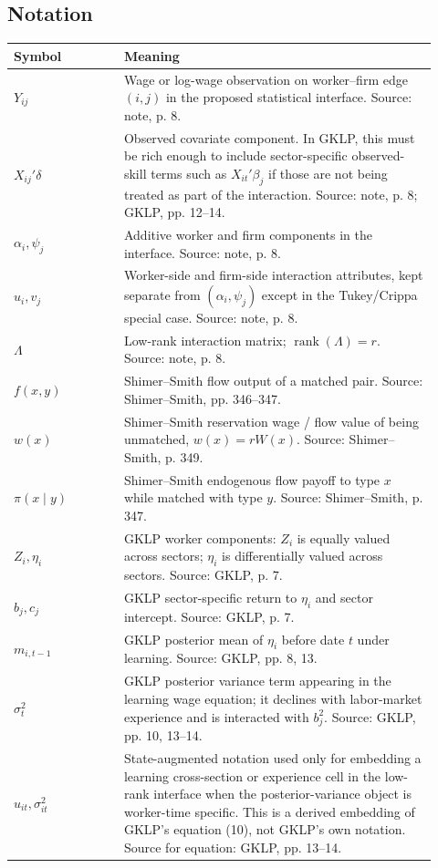 \documentclass[11pt]{article}
\begin{document}
\subsection{Notation}

\begin{center}
\begin{tabular}{>{\raggedright\arraybackslash}p{0.24\linewidth}
                >{\raggedright\arraybackslash}p{0.68\linewidth}}
\toprule
Symbol & Meaning \\
\midrule
$Y_{ij}$ & Wage or log-wage observation on worker--firm edge $(i,j)$ in the proposed statistical interface. Source: note, p. 8. \\
$X_{ij}'\delta$ & Observed covariate component. In GKLP, this must be rich enough to include sector-specific observed-skill terms such as $X_{it}'\beta_j$ if those are not being treated as part of the interaction. Source: note, p. 8; GKLP, pp. 12--14. \\
$\alpha_i,\psi_j$ & Additive worker and firm components in the interface. Source: note, p. 8. \\
$u_i,v_j$ & Worker-side and firm-side interaction attributes, kept separate from $(\alpha_i,\psi_j)$ except in the Tukey/Crippa special case. Source: note, p. 8. \\
$\Lambda$ & Low-rank interaction matrix; $\operatorname{rank}(\Lambda)=r$. Source: note, p. 8. \\
$f(x,y)$ & Shimer--Smith flow output of a matched pair. Source: Shimer--Smith, pp. 346--347. \\
$w(x)$ & Shimer--Smith reservation wage / flow value of being unmatched, $w(x)=rW(x)$. Source: Shimer--Smith, p. 349. \\
$\pi(x\mid y)$ & Shimer--Smith endogenous flow payoff to type $x$ while matched with type $y$. Source: Shimer--Smith, p. 347. \\
$Z_i,\eta_i$ & GKLP worker components: $Z_i$ is equally valued across sectors; $\eta_i$ is differentially valued across sectors. Source: GKLP, p. 7. \\
$b_j,c_j$ & GKLP sector-specific return to $\eta_i$ and sector intercept. Source: GKLP, p. 7. \\
$m_{i,t-1}$ & GKLP posterior mean of $\eta_i$ before date $t$ under learning. Source: GKLP, pp. 8, 13. \\
$\sigma_t^2$ & GKLP posterior variance term appearing in the learning wage equation; it declines with labor-market experience and is interacted with $b_j^2$. Source: GKLP, pp. 10, 13--14. \\
$u_{it},\sigma_{it}^2$ & State-augmented notation used only for embedding a learning cross-section or experience cell in the low-rank interface when the posterior-variance object is worker-time specific. This is a derived embedding of GKLP's equation (10), not GKLP's own notation. Source for equation: GKLP, pp. 13--14. \\
\bottomrule
\end{tabular}
\end{center}
\end{document}
